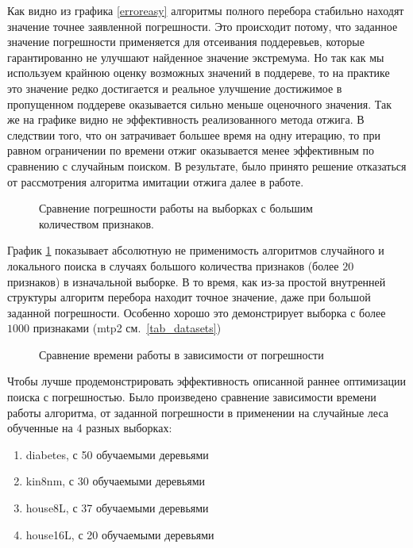 Как видно из графика \cref{erroreasy} алгоритмы полного перебора стабильно
находят значение точнее заявленной погрешности. Это происходит потому, что
заданное значение погрешности применяется для отсеивания поддеревьев, которые
гарантированно не улучшают найденное значение экстремума. Но так как мы
используем крайнюю оценку возможных значений в поддереве, то на практике это
значение редко достигается и реальное улучшение достижимое в пропущенном
поддереве оказывается сильно меньше оценочного значения. Так же на графике видно
не эффективность реализованного метода отжига. В следствии того, что он
затрачивает большее время на одну итерацию, то при равном ограничении по времени
отжиг оказывается менее эффективным по сравнению с случайным поиском.
В результате, было принято решение отказаться от рассмотрения алгоритма имитации
отжига далее в работе.

\begin{figure}[H]
    \caption{Сравнение погрешности работы на выборках с большим количеством
    признаков.}\label{errorbig}
\end{figure} 

График \cref{errorbig} показывает абсолютную не применимость алгоритмов
случайного и локального поиска в случаях большого количества признаков (более
$20$ признаков) в изначальной выборке. В то время, как из-за простой внутренней
структуры алгоритм перебора находит точное значение, даже при большой заданной
погрешности. Особенно хорошо это демонстрирует выборка с более $1000$ признаками
(mtp2 см.~\cref{tab_datasets})

\begin{figure}[H]
    \caption{Сравнение времени работы в зависимости от
    погрешности}\label{error_to_time}
\end{figure}

Чтобы лучше продемонстрировать эффективность описанной раннее оптимизации поиска
с погрешностью. Было произведено сравнение зависимости времени работы алгоритма,
от заданной погрешности в применении на случайные леса обученные на 4 разных
выборках:

\begin{enumerate}
    \item diabetes, с 50 обучаемыми деревьями
    \item kin8nm, с 30 обучаемыми деревьями
    \item house8L, с 37 обучаемыми деревьями
    \item house16L, с 20 обучаемыми деревьями
\end{enumerate}

